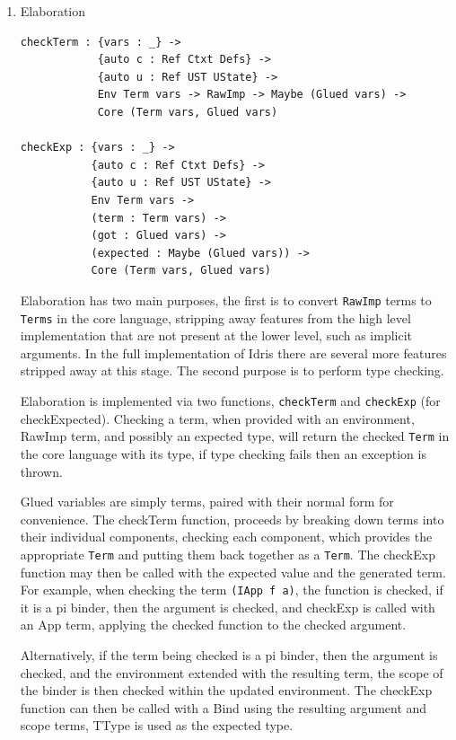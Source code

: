\documentclass[a4paper]{article}
\begin{document}
\begin{enumerate}
\item Elaboration
\label{sec:org3c636be}
\begin{center}
\begin{verbatim}
checkTerm : {vars : _} ->
			{auto c : Ref Ctxt Defs} ->
			{auto u : Ref UST UState} ->
			Env Term vars -> RawImp -> Maybe (Glued vars) ->
			Core (Term vars, Glued vars)

checkExp : {vars : _} ->
		   {auto c : Ref Ctxt Defs} ->
		   {auto u : Ref UST UState} ->
		   Env Term vars ->
		   (term : Term vars) ->
		   (got : Glued vars) ->
		   (expected : Maybe (Glued vars)) ->
		   Core (Term vars, Glued vars)
\end{verbatim}
\end{center}

Elaboration has two main purposes, the first is to convert \texttt{RawImp} terms
to \texttt{Terms} in the core language, stripping away features from the high 
level implementation that are not present at the lower level, such as 
implicit arguments. In the full implementation of Idris there are several more 
features stripped away at this stage. The second purpose is to perform 
type checking.  

Elaboration is implemented via two functions, \texttt{checkTerm} and \texttt{checkExp}
(for checkExpected). Checking a term, when provided with an environment,
RawImp term, and possibly an expected type, will return the checked 
\texttt{Term} in the core language with its type, if type checking fails then an
exception is thrown. 

Glued variables are simply terms, paired with their normal form for 
convenience. The checkTerm function, proceeds by breaking
down terms into their individual components, checking each component,
which provides the appropriate \texttt{Term} and putting them back together as
a \texttt{Term}. The checkExp function may then be called with the expected value and the 
generated term. For example, when checking the term \texttt{(IApp f a)},  
the function is checked, if it is a pi binder, then the argument is checked, and
checkExp is called with an App term, applying the checked function to the checked argument.

Alternatively, if the term being checked is a pi binder, then the argument is checked, and the environment
extended with the resulting term, the scope of the binder is then checked within the updated 
environment. The checkExp function can then be called with a Bind using the resulting argument and scope terms,
TType is used as the expected type.


\end{enumerate}
\end{document}
